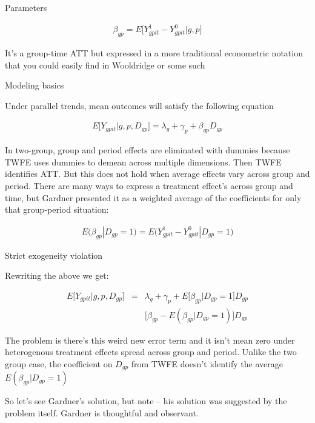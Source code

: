 \documentclass{beamer}
\begin{document}
\begin{frame}{Parameters}

\begin{eqnarray*}
\beta_{gp} = E \bigg [ Y^1_{gpit} - Y^0_{gpit} | g,p \bigg ]
\end{eqnarray*}

\bigskip

It's a group-time ATT but expressed in a more traditional econometric notation that you could easily find in Wooldridge or some such

\end{frame}

\begin{frame}{Modeling basics}

Under parallel trends, mean outcomes will satisfy the following equation

\bigskip

\begin{eqnarray*}
E \bigg [ Y_{gpit} | g,p,D_{gp} \bigg ] = \lambda_g + \gamma_p + \beta_{gp} D_{gp}
\end{eqnarray*}

\bigskip

In two-group, group and period effects are eliminated with dummies because TWFE uses dummies to demean across multiple dimensions. Then TWFE identifies ATT.  But this does not hold when average effects vary across group and period. There are many ways to express a treatment effect's across group and time, but Gardner presented it as a weighted average of the coefficients for only that group-period situation:

\begin{eqnarray*}
E \bigg (\beta_{gp} | D_{gp}=1 \bigg ) = E \bigg (Y^1_{gpit} - Y^0_{gpit} | D_{gp}=1 \bigg )
\end{eqnarray*}

\end{frame}


\begin{frame}{Strict exogeneity violation}

Rewriting the above we get:

\begin{eqnarray*}
E \bigg [ Y_{gpit} | g,p, D_{gp} \bigg ] &=& \lambda_g + \gamma_p + E \bigg [\beta_{gp} | D_{gp} =1 \bigg ] D_{gp} \\
&& \bigg [\beta_{gp} - E ( \beta_{gp} | D_{gp} = 1 ) \bigg ] D_{gp}
\end{eqnarray*}

\bigskip

The problem is there's this weird new error term and it isn't mean zero under heterogenous treatment effects spread across group and period.  Unlike the two group case, the coefficient on $D_{gp}$ from TWFE doesn't identify the average $E(\beta_{gp} | D_{gp}=1)$ 

\bigskip

So let's see Gardner's solution, but note -- his solution was suggested by the problem itself. Gardner is thoughtful and observant.

\end{frame}
\end{document}
